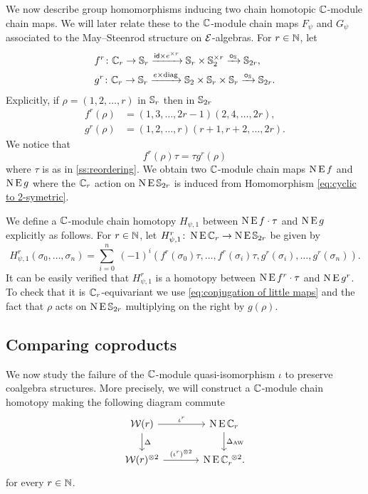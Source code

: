 We now describe group homomorphisms inducing two chain homotopic $\mathbb{C}$-module chain maps.
We will later relate these to the $\mathbb{C}$-module chain maps $F_\psi$ and $G_\psi$ associated to the May--Steenrod structure on $\mathcal{E}$-algebras.
For $r \in \mathbb{N}$, let
\[
\begin{split}
	&f^r \colon \mathbb{C}_r \to \mathbb{S}_r \xrightarrow{\mathsf{id} \times e^{\times r}} \mathbb{S}_r \times \mathbb{S}_2^{\times r} \xrightarrow{\bm{\circ}_{\mathbb{S}}} \mathbb{S}_{2r}, \\
	&g^r \colon \mathbb{C}_r \to \mathbb{S}_r \xrightarrow{e \times \mathrm{diag}} \mathbb{S}_2 \times \mathbb{S}_r \times \mathbb{S}_r \xrightarrow{\bm{\circ}_{\mathbb{S}}} \mathbb{S}_{2r}.
\end{split}
\]
Explicitly, if $\rho = (1,2,\dots,r)$ in $\mathbb{S}_r$ then in $\mathbb{S}_{2r}$
\begin{align*}
	f^r(\rho) &= (1,3,\dots,2r-1)(2,4,\dots,2r), \\
	g^r(\rho) &= (1,2,\dots,r)(r+1,r+2,\dots,2r).
\end{align*}
We notice that
\begin{equation}\label{eq:conjugation of little maps}
	f^r(\rho) \tau = \tau g^r(\rho)
\end{equation}
where $\tau$ is as in \cref{ss:reordering}.
We obtain two $\mathbb{C}$-module chain maps $\operatorname{N}\operatorname{E} f$ and $\operatorname{N}\operatorname{E} g$ where the $\mathbb{C}_r$ action on $\operatorname{N}\operatorname{E}\mathbb{S}_{2r}$ is induced from Homomorphism \eqref{eq:cyclic to 2-symetric}.

We define a $\mathbb{C}$-module chain homotopy $H_{\psi,1}$ between $\operatorname{N} \operatorname{E} f \cdot \tau$ and $\operatorname{N} \operatorname{E} g$
explicitly as follows.
For $r \in \mathbb{N}$, let $H_{\psi,1}^r \colon \operatorname{N}\operatorname{E}\mathbb{C}_r \to \operatorname{N}\operatorname{E}\mathbb{S}_{2r}$ be given by
\[
H_{\psi,1}^r(\sigma_0,\dots,\sigma_n) =
\sum_{i=0}^n \ (-1)^i (f^r(\sigma_0) \tau, \dots, f^r(\sigma_i) \tau, g^r(\sigma_i), \dots, g^r(\sigma_n)).
\]
It can be easily verified that $H_{\psi,1}^r$ is a homotopy between $\operatorname{N} \operatorname{E} f^r \cdot \tau$ and $\operatorname{N} \operatorname{E} g^r$.
To check that it is $\mathbb{C}_r$-equivariant we use \cref{eq:conjugation of little maps} and the fact that $\rho$ acts on $\operatorname{N}\operatorname{E}\mathbb{S}_{2r}$ multiplying on the right by $g(\rho)$.

\subsection{Comparing coproducts}

We now study the failure of the $\mathbb{C}$-module quasi-isomorphism $\iota$ to preserve coalgebra structures.
More precisely, we will construct a $\mathbb{C}$-module chain homotopy making the following diagram commute
\[
\begin{tikzcd}[column sep=large]
	\cW(r) \arrow[r,"\iota^r"] \arrow[d,"\Delta"] & \chains\EE\cyc_r \arrow[d,"\Delta_{\AW}"]\\
	\cW(r)^{\ot 2} \arrow[r,"(\iota^r)^{\ot 2}"] & \chains\EE\cyc_r^{\ \ot 2}.
\end{tikzcd}
\]
for every $r \in \mathbb{N}$.

